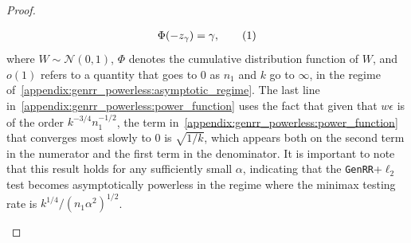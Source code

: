 \documentclass[twoside,11pt]{article}
\newcommand\numberthis{\addtocounter{equation}{1}\tag{\theequation}}
\newcommand{\alphabetSize}{k} %
\newcommand{\sampleSize}{n}
\newcommand{\privacyParameter}{\alpha} %
\begin{document}
\begin{appendix}
\begin{proof}
\begin{itemize}
\begin{align*}
			\Phi \!
			\left( -z_\gamma \right) = \gamma,
			\numberthis
			\label{appendix:genrr_powerless:power_function}
		\end{align*}
		where $W \sim \mathcal{N}(0,1)$,   $\Phi$ denotes the cumulative distribution function of $W$, and $o(1)$ refers to a quantity that goes to 0 as $\sampleSize_1$ and $\alphabetSize$ go to $\infty$, in the regime of~\eqref{appendix:genrr_powerless:asymptotic_regime}.
		The last line in~\eqref{appendix:genrr_powerless:power_function} uses the fact that given that $w\epsilon$ is of the order $\alphabetSize^{-3/4}\sampleSize_1^{-1/2}$, the term in~\eqref{appendix:genrr_powerless:power_function} that converges most slowly to 0 is $\sqrt{1/\alphabetSize}$, which appears both on the second term in the numerator and the first term in the denominator.  It is important to note that this result holds for any sufficiently small $\privacyParameter$, indicating that the \texttt{GenRR}+$\ell_2$ test becomes asymptotically powerless in the regime where the minimax testing rate is $\alphabetSize^{1/4} / (\sampleSize_1 \privacyParameter^2)^{1/2}$.
\end{itemize}
	\end{proof}
\end{appendix}



\vskip 0.2in

\end{document}
